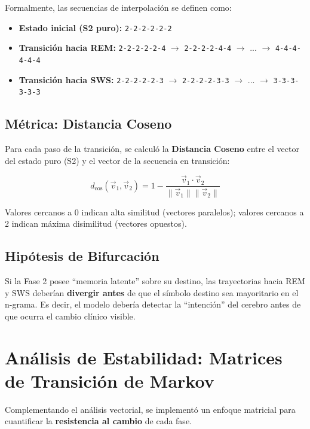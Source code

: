 Formalmente, las secuencias de interpolación se definen como:
\begin{itemize}
    \item \textbf{Estado inicial (S2 puro):} \texttt{2-2-2-2-2-2}
    \item \textbf{Transición hacia REM:} \texttt{2-2-2-2-2-4} $\rightarrow$ \texttt{2-2-2-2-4-4} $\rightarrow$ ... $\rightarrow$ \texttt{4-4-4-4-4-4}
    \item \textbf{Transición hacia SWS:} \texttt{2-2-2-2-2-3} $\rightarrow$ \texttt{2-2-2-2-3-3} $\rightarrow$ ... $\rightarrow$ \texttt{3-3-3-3-3-3}
\end{itemize}

\subsection{Métrica: Distancia Coseno}

Para cada paso de la transición, se calculó la \textbf{Distancia Coseno} entre el vector del estado puro (S2) y el vector de la secuencia en transición:

\begin{equation}
    d_{\cos}(\vec{v}_1, \vec{v}_2) = 1 - \frac{\vec{v}_1 \cdot \vec{v}_2}{\|\vec{v}_1\| \|\vec{v}_2\|}
    \label{eq:distancia_coseno}
\end{equation}

Valores cercanos a 0 indican alta similitud (vectores paralelos); valores cercanos a 2 indican máxima disimilitud (vectores opuestos).

\subsection{Hipótesis de Bifurcación}

Si la Fase 2 posee ``memoria latente'' sobre su destino, las trayectorias hacia REM y SWS deberían \textbf{divergir antes} de que el símbolo destino sea mayoritario en el n-grama. Es decir, el modelo debería detectar la ``intención'' del cerebro antes de que ocurra el cambio clínico visible.

\section{Análisis de Estabilidad: Matrices de Transición de Markov}

Complementando el análisis vectorial, se implementó un enfoque matricial para cuantificar la \textbf{resistencia al cambio} de cada fase.

